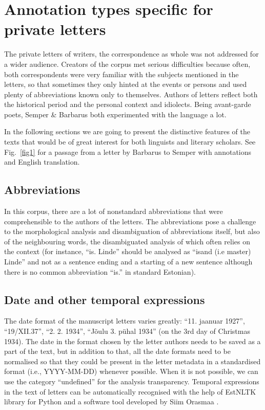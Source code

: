 \documentclass[runningheads]{llncs}
\begin{document}
\section{Annotation types specific for private letters}

The private letters of writers, the correspondence as whole was not addressed for a wider audience. Creators of the corpus met serious difficulties because often, both correspondents were very familiar with the subjects mentioned in the letters, so that sometimes they only hinted at the events or persons and used plenty of abbreviations known only to themselves. Authors of letters reflect both the historical period and the personal context and idiolects. Being avant-garde poets, Semper \& Barbarus both experimented with the language a lot. 

In the following sections we are going to present the distinctive features of the texts that would be of great interest for both linguists and literary scholars.  See Fig.~\ref{fig1} for a passage from a letter by Barbarus to Semper with annotations and English translation.

\subsection{Abbreviations}

In this corpus, there are a lot of nonstandard abbreviations that were comprehensible to the authors of the letters. The abbreviations pose a challenge to the morphological analysis and disambiguation of abbreviations itself, but also of the neighbouring words, the disambiguated analysis of which often relies on the context (for instance, ``is. Linde'' should be analysed as ``isand (i.e master) Linde'' and not as a sentence ending and a starting of a new sentence although there is no common abbreviation ``is.'' in standard Estonian). 

\subsection{Date and other temporal expressions}

The date format of the manuscript letters varies greatly: ``11. jaanuar 1927'', ``19/XII.37'', ``2. 2. 1934'', ``J\~oulu 3. p\"uhal 1934'' (on the 3rd day of Christmas 1934). The date in the format chosen by the letter authors needs to be saved as a part of the text, but in addition to that, all the date formats need to be normalised so that they could be present in the letter metadata in a standardised format (i.e., YYYY-MM-DD) whenever possible. When it is not possible, we can use the category ``undefined'' for the analysis transparency. Temporal expressions in the text of letters can be automatically recognised with the help of EstNLTK library for Python \cite{ORASMAA16.332} and a software tool developed by Siim Orasmaa \cite{ORASMAA14.530}. 
\end{document}
